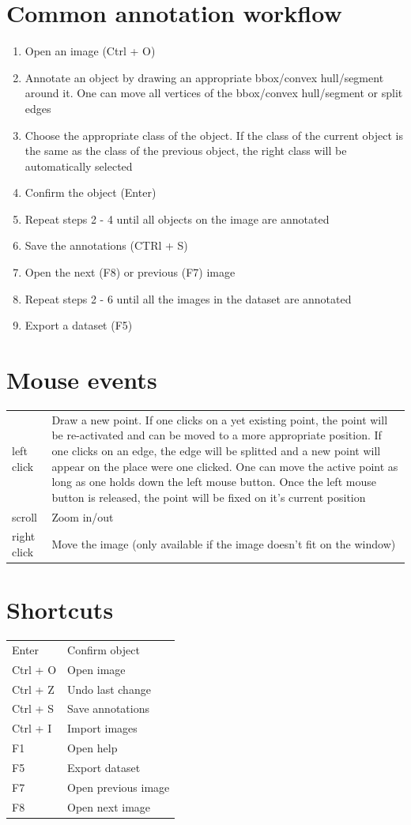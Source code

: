 \documentclass[a4paper, 11pt]{article}
\begin{document}
\section{Common annotation workflow}

\begin{enumerate}
	\item Open an image (Ctrl + O)
	\item Annotate an object by drawing an appropriate bbox/convex hull/segment around it. One can move all vertices of the bbox/convex hull/segment or split edges
	\item Choose the appropriate class of the object. If the class of the current object is the same as the class of the previous object, the right class will be automatically selected
	\item Confirm the object (Enter)
	\item Repeat steps 2 - 4 until all objects on the image are annotated
	\item Save the annotations (CTRl + S)
	\item Open the next (F8) or previous (F7) image
	\item Repeat steps 2 - 6 until all the images in the dataset are annotated
	\item Export a dataset (F5)
\end{enumerate}

\section{Mouse events}


\begin{tabular}{ p{2cm} p{14cm}}
	left click & Draw a new point. If one clicks on a yet existing point, the point will be re-activated and can be moved to a more appropriate position. If one clicks on an edge, the edge will be splitted and a new point will appear on the place were one clicked. One can move the active point as long as one holds down the left mouse button. Once the left mouse button is released, the point will be fixed on it's current position\\ 
	scroll & Zoom in/out \\  
	right click & Move the image (only available if the image doesn't fit on the window)     
\end{tabular}


\section{Shortcuts}


\begin{tabular}{ p{2cm} p{13cm}}
	Enter & Confirm object\\ 
	Ctrl + O & Open image\\  
	Ctrl + Z & Undo last change\\  
	Ctrl + S & Save annotations\\ 
	Ctrl + I & Import images\\
	F1 & Open help\\ 
	F5 & Export dataset\\ 
	F7 & Open previous image\\ 
	F8 & Open next image\\  
\end{tabular}
\end{document}
